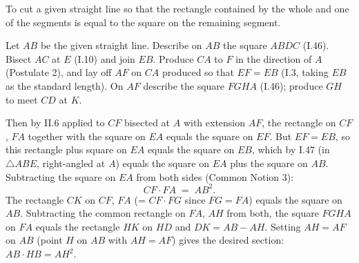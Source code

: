 \documentclass{rrxiv}
\begin{document}
\begin{claim}
\label{prop:II.11}
To cut a given straight line so that the rectangle contained by the
whole and one of the segments is equal to the square on the remaining
segment.
\end{claim}
\begin{evidence}[Proof of II.11]
\label{ev:II.11}

Let $AB$ be the given straight line.  Describe on $AB$ the square
$ABDC$ (I.46).  Bisect $AC$ at $E$ (I.10) and join $EB$.  Produce
$CA$ to $F$ in the direction of $A$ (Postulate 2), and lay off
$AF$ on $CA$ produced so that $EF = EB$ (I.3, taking $EB$ as
the standard length).  On $AF$ describe the square $FGHA$ (I.46);
produce $GH$ to meet $CD$ at $K$.

Then by II.6 applied to $CF$ bisected at $A$ with extension $AF$,
the rectangle on $CF$, $FA$ together with the square on $EA$ equals
the square on $EF$.  But $EF = EB$, so this rectangle plus square
on $EA$ equals the square on $EB$, which by I.47 (in
$\triangle ABE$, right-angled at $A$) equals the square on $EA$
plus the square on $AB$.  Subtracting the square on $EA$ from both
sides (Common Notion 3):
\[
    CF \cdot FA \;=\; AB^2.
\]
The rectangle $CK$ on $CF$, $FA$ (= $CF \cdot FG$ since $FG = FA$)
equals the square on $AB$.  Subtracting the common rectangle on
$FA$, $AH$ from both, the square $FGHA$ on $FA$ equals the rectangle
$HK$ on $HD$ and $DK = AB - AH$.  Setting $AH = AF$ on $AB$ (point
$H$ on $AB$ with $AH = AF$) gives the desired section: $AB \cdot HB
= AH^2$.
\end{evidence}
\end{document}
